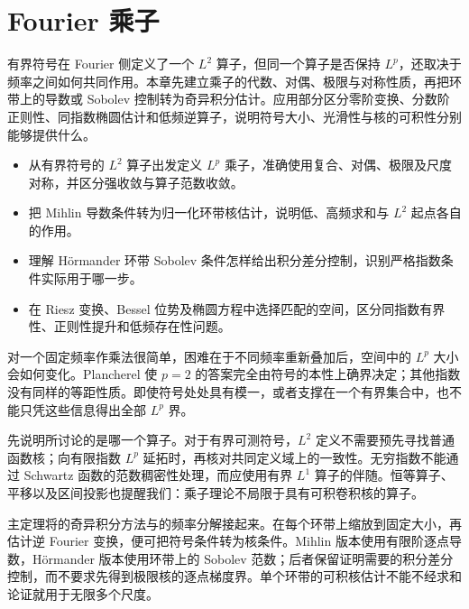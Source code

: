\chapter{Fourier 乘子}
\label{b2:ch:22}
\begin{chapterabstract}
有界符号在 Fourier 侧定义了一个 \(L^2\) 算子，但同一个算子是否保持 \(L^p\)，还取决于频率之间如何共同作用。本章先建立乘子的代数、对偶、极限与对称性质，再把环带上的导数或 Sobolev 控制转为奇异积分估计。应用部分区分零阶变换、分数阶正则性、同指数椭圆估计和低频逆算子，说明符号大小、光滑性与核的可积性分别能够提供什么。
\end{chapterabstract}

\begin{learninggoals}\begin{itemize}
\item\label{b2:item:22-goal-1}从有界符号的 \(L^2\) 算子出发定义 \(L^p\) 乘子，准确使用复合、对偶、极限及尺度对称，并区分强收敛与算子范数收敛。
\item\label{b2:item:22-goal-2}把 Mihlin 导数条件转为归一化环带核估计，说明低、高频求和与 \(L^2\) 起点各自的作用。
\item\label{b2:item:22-goal-3}理解 Hörmander 环带 Sobolev 条件怎样给出积分差分控制，识别严格指数条件实际用于哪一步。
\item\label{b2:item:22-goal-4}在 Riesz 变换、Bessel 位势及椭圆方程中选择匹配的空间，区分同指数有界性、正则性提升和低频存在性问题。
\end{itemize}\end{learninggoals}

对一个固定频率作乘法很简单，困难在于不同频率重新叠加后，空间中的 \(L^p\) 大小会如何变化。Plancherel 使 \(p=2\) 的答案完全由符号的本性上确界决定；其他指数没有同样的等距性质。即使符号处处具有模一，或者支撑在一个有界集合中，也不能只凭这些信息得出全部 \(L^p\) 界。

\ProseParagraphBreak

先说明所讨论的是哪一个算子。对于有界可测符号，\(L^2\) 定义不需要预先寻找普通函数核；向有限指数 \(L^p\) 延拓时，再核对共同定义域上的一致性。无穷指数不能通过 Schwartz 函数的范数稠密性处理，而应使用有界 \(L^1\) 算子的伴随。恒等算子、平移以及区间投影也提醒我们：乘子理论不局限于具有可积卷积核的算子。

\ProseParagraphBreak

主定理将的奇异积分方法与的频率分解接起来。在每个环带上缩放到固定大小，再估计逆 Fourier 变换，便可把符号条件转为核条件。Mihlin 版本使用有限阶逐点导数，Hörmander 版本使用环带上的 Sobolev 范数；后者保留证明需要的积分差分控制，而不要求先得到极限核的逐点梯度界。单个环带的可积核估计不能不经求和论证就用于无限多个尺度。

